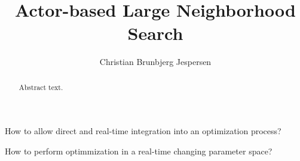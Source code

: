 \documentclass[preprint,12pt,authoryear]{elsarticle}
\begin{document}
\begin{frontmatter}



\title{Actor-based Large Neighborhood Search} %




\author{Christian Brunbjerg Jespersen} %


\begin{abstract}
Abstract text.
\end{abstract}

\begin{graphicalabstract}
\end{graphicalabstract}

\begin{highlights}
\item How to allow direct and real-time integration into an optimization process?
\item How to perform optimmization in a real-time changing parameter space?
\end{highlights}


\end{frontmatter}
\end{document}
